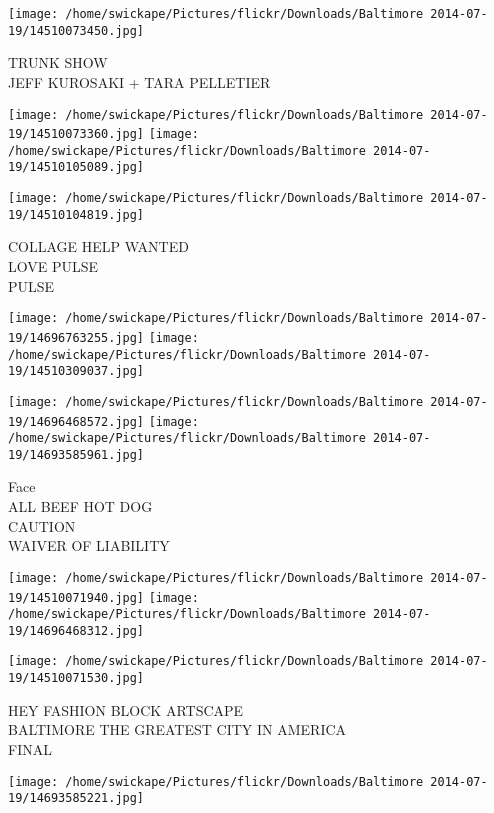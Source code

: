 \documentclass[10pt,letterpaper]{article}
\begin{document}
\vspace{0.25in}
\texttt{[image: /home/swickape/Pictures/flickr/Downloads/Baltimore 2014-07-19/14510073450.jpg]}

TRUNK SHOW\\
JEFF KUROSAKI + TARA PELLETIER\\
\pagebreak

\texttt{[image: /home/swickape/Pictures/flickr/Downloads/Baltimore 2014-07-19/14510073360.jpg]}
\texttt{[image: /home/swickape/Pictures/flickr/Downloads/Baltimore 2014-07-19/14510105089.jpg]}

\vspace{0.25in}
\texttt{[image: /home/swickape/Pictures/flickr/Downloads/Baltimore 2014-07-19/14510104819.jpg]}

COLLAGE HELP WANTED\\
LOVE PULSE\\
PULSE\\
\pagebreak

\texttt{[image: /home/swickape/Pictures/flickr/Downloads/Baltimore 2014-07-19/14696763255.jpg]}
\texttt{[image: /home/swickape/Pictures/flickr/Downloads/Baltimore 2014-07-19/14510309037.jpg]}

\texttt{[image: /home/swickape/Pictures/flickr/Downloads/Baltimore 2014-07-19/14696468572.jpg]}
\texttt{[image: /home/swickape/Pictures/flickr/Downloads/Baltimore 2014-07-19/14693585961.jpg]}

Face\\
ALL BEEF HOT DOG\\
CAUTION\\
WAIVER OF LIABILITY\\
\pagebreak

\texttt{[image: /home/swickape/Pictures/flickr/Downloads/Baltimore 2014-07-19/14510071940.jpg]}
\texttt{[image: /home/swickape/Pictures/flickr/Downloads/Baltimore 2014-07-19/14696468312.jpg]}

\texttt{[image: /home/swickape/Pictures/flickr/Downloads/Baltimore 2014-07-19/14510071530.jpg]}

HEY FASHION BLOCK ARTSCAPE\\
BALTIMORE THE GREATEST CITY IN AMERICA\\
FINAL\\
\pagebreak

\texttt{[image: /home/swickape/Pictures/flickr/Downloads/Baltimore 2014-07-19/14693585221.jpg]}
\end{document}
